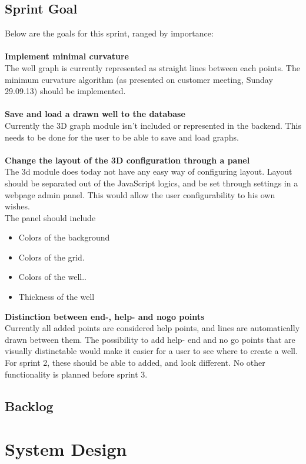 \documentclass{report}
\begin{document}
\subsection{Sprint Goal} \label{subsec:sprint_goal2}
Below are the goals for this sprint, ranged by importance:\\\\
\textbf{Implement minimal curvature}\\
The well graph is currently represented as straight lines between each points. The minimum curvature algorithm (as presented on customer meeting, Sunday 29.09.13) should be implemented.\\ \\
\textbf{Save and load a drawn well to the database}\\
Currently the 3D graph module isn’t included or represented in the backend. This needs to be done for the user to be able to save and load graphs.\\ \\
\textbf{Change the layout of the 3D configuration through a panel} \\
The 3d module does today not have any easy way of configuring layout. Layout should be separated out of the JavaScript logics, and be set through settings in a webpage admin panel. This would allow the user configurability to his own wishes. \\ 
The panel should include
\begin{itemize}
\item Colors of the background
\item Colors of the grid.
\item Colors of the well..
\item Thickness of the well
\end{itemize} 
\textbf{Distinction between end-, help- and nogo points}\\
Currently all added points are considered help points, and lines are automatically drawn between them. The possibility to add help- end and no go points that are visually distinctable would make it easier for a user to see where to create a well. For sprint 2, these should be able to added, and look different. No other functionality is planned before sprint 3.

\subsection{Backlog} \label{subsec:backlog2} %
\section{System Design} \label{sec:system_design2}
\end{document}

